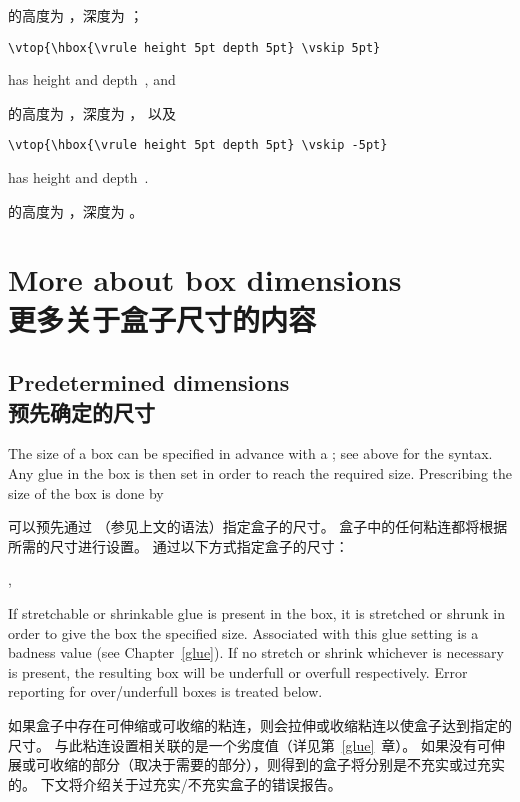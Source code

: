 的高度为 \n{0pt}，深度为 \n{5pt}；
\begin{verbatim}
\vtop{\hbox{\vrule height 5pt depth 5pt} \vskip 5pt}
\end{verbatim}
has height \n{5pt} and depth~\n{10pt}, and

的高度为 \n{5pt}，深度为 \n{10pt}，
以及
\begin{verbatim}
\vtop{\hbox{\vrule height 5pt depth 5pt} \vskip -5pt}
\end{verbatim}
has height \n{5pt} and depth~\n{0pt}.

的高度为 \n{5pt}，深度为 \n{0pt}。


\section{More about box dimensions\\更多关于盒子尺寸的内容}

\subsection{Predetermined dimensions\\预先确定的尺寸}

The size of a box can be specified in advance
with a ; see above for the syntax.
Any glue
in the box is then set in order to reach the required size.
Prescribing the size of the box is done by

可以预先通过 （参见上文的语法）指定盒子的尺寸。
盒子中的任何粘连都将根据所需的尺寸进行设置。
通过以下方式指定盒子的尺寸：
\begin{disp}   ,
        \end{disp}
\awp
If stretchable or shrinkable glue is present in the box,
it is stretched or shrunk in order to give the box the
specified size. Associated with this glue setting is a badness value
(see Chapter~\ref{glue}). If no stretch or shrink \ldash whichever
is necessary \rdash  is present, the resulting box will be underfull
or overfull respectively. Error reporting for over/underfull
boxes is treated below.

如果盒子中存在可伸缩或可收缩的粘连，则会拉伸或收缩粘连以使盒子达到指定的尺寸。
与此粘连设置相关联的是一个劣度值（详见第~\ref{glue}~章）。
如果没有可伸展或可收缩的部分（取决于需要的部分），则得到的盒子将分别是不充实或过充实的。
下文将介绍关于过充实/不充实盒子的错误报告。

